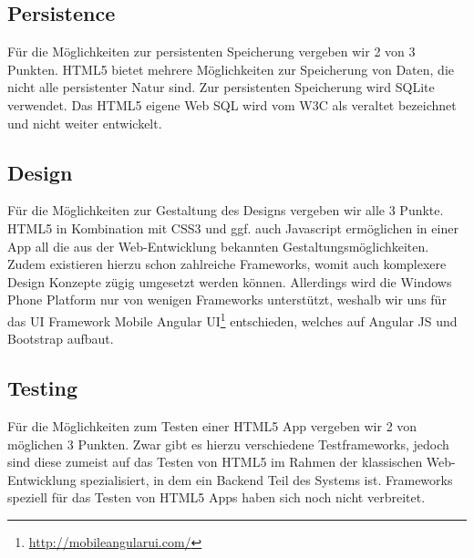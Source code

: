 \subsection{Persistence}
Für die Möglichkeiten zur persistenten Speicherung vergeben wir 2 von 3 Punkten. HTML5 bietet mehrere Möglichkeiten zur Speicherung von Daten, die nicht alle persistenter Natur sind. Zur persistenten Speicherung wird SQLite verwendet. Das HTML5 eigene Web SQL wird vom W3C als veraltet bezeichnet und nicht weiter entwickelt.

\subsection{Design}
Für die Möglichkeiten zur Gestaltung des Designs vergeben wir alle 3 Punkte. HTML5 in Kombination mit CSS3 und ggf. auch Javascript ermöglichen in einer App all die aus der Web-Entwicklung bekannten Gestaltungsmöglichkeiten. Zudem existieren hierzu schon zahlreiche Frameworks, womit auch komplexere Design Konzepte zügig umgesetzt werden können. Allerdings wird die Windows Phone Platform nur von wenigen Frameworks unterstützt, weshalb wir uns für das UI Framework Mobile Angular UI\footnote{\url{http://mobileangularui.com/}} entschieden, welches auf Angular JS und Bootstrap aufbaut.

\subsection{Testing}
Für die Möglichkeiten zum Testen einer HTML5 App vergeben wir 2 von möglichen 3 Punkten. Zwar gibt es hierzu verschiedene Testframeworks, jedoch sind diese zumeist auf das Testen von HTML5 im Rahmen der klassischen Web-Entwicklung spezialisiert, in dem ein Backend Teil des Systems ist. Frameworks speziell für das Testen von HTML5 Apps haben sich noch nicht verbreitet.

